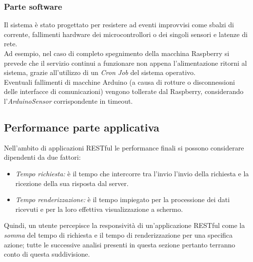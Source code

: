\documentclass[12pt]{article}
\begin{document}
\subsubsection{Parte software}
Il sistema è stato progettato per resistere ad eventi improvvisi come sbalzi di corrente, fallimenti hardware dei microcontrollori o dei singoli sensori e latenze di rete.\\
Ad esempio, nel caso di completo spegnimento della macchina Raspberry si prevede che il servizio continui a funzionare non appena l'alimentazione ritorni al sistema, grazie all'utilizzo di un \textit{Cron Job} del sistema operativo.\\
Eventuali fallimenti di macchine Arduino (a causa di rotture o disconnessioni delle interfacce di comunicazioni) vengono tollerate dal Raspberry, considerando l'\textit{ArduinoSensor} corrispondente in timeout.
\newpage
\subsection{Performance parte applicativa}
Nell'ambito di applicazioni RESTful le performance finali si possono considerare dipendenti da due fattori:
\begin{itemize}
\item \textit{Tempo richiesta:} è il tempo che intercorre tra l'invio l'invio della richiesta e la ricezione della sua risposta dal server.
\item \textit{Tempo renderizzazione:} è il tempo impiegato per la processione dei dati ricevuti e per la loro effettiva visualizzazione a schermo.
\end{itemize}
Quindi, un utente percepisce la responsività di un'applicazione RESTful come la \textit{somma} del tempo di richiesta e il tempo di renderizzazione per una specifica azione; tutte le successive analisi presenti in questa sezione pertanto terranno conto di questa suddivisione.
\end{document}
